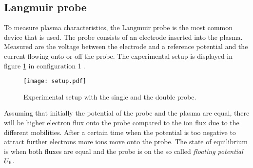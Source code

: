 \subsection{Langmuir probe}\label{subsec:singlelangmuir}

To measure plasma characteristics, the Langmuir probe is the most common device that is used. The probe consists of an electrode inserted into the plasma. Measured are the voltage between the electrode and a reference potential and the current flowing onto or off the probe. The experimental setup is displayed in figure \ref{fig:setup} in configuration \textcircled{{\scriptsize 1}}.
\begin{figure}[tb]
	\centering
	\texttt{[image: setup.pdf]}
	\caption{\label{fig:setup}Experimental setup with the single and the double probe.}
\end{figure}
Assuming that initially the potential of the probe and the plasma are equal, there will be higher electron flux onto the probe compared to the ion flux due to the different mobilities. After a certain time when the potential is too negative to attract further electrons more ions move onto the probe. The state of equilibrium is when both fluxes are equal and the probe is on the so called \emph{floating potential} $U_{\text{\scriptsize fl}}$. 

